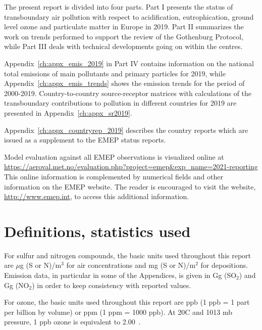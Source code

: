 The present report is divided into four parts. Part I presents the status
of transboundary air pollution with respect to acidification, eutrophication,
ground level ozone and particulate matter in Europe in 2019.
Part II summarizes the work on trends performed to support the review of the Gothenburg Protocol, while Part III deals with technical developments going on within the centres.

Appendix~\ref{ch:appx_emis_2019} in Part IV contains information on the national total emissions of main pollutants and  primary particles for 2019, while Appendix~\ref{ch:appx_emis_trends} shows the  emission trends for the period of 2000-2019. Country-to-country source-receptor matrices with calculations of
the transboundary contributions to pollution in different countries
for 2019 are presented in Appendix~\ref{ch:appx_sr2019}.

Appendix~\ref{ch:appx_countryrep_2019} describes the country
reports which are  issued as a supplement to the EMEP status reports.

Model evaluation against all EMEP observations is visualized online at \url{https://aeroval.met.no/evaluation.php?project=emep&exp_name=2021-reporting}
This online information is complemented by numerical fields and other
information on the EMEP website. The reader is encouraged to visit the
website, \url{http://www.emep.int}, to access this additional information.



\section{Definitions, statistics used}
\label{DEFS}

For sulfur and nitrogen compounds, the basic units used throughout
this report are $\mu$g (S or N)/m$^{3}$ for air concentrations and
mg (S or N)/m$^{2}$ for depositions. Emission data, in particular in
some of the Appendices, is given in Gg (SO$_2$)  and Gg (NO$_2$) in
order to keep consistency with reported values.

For ozone, the basic units used throughout this report are ppb (1 ppb
= 1 part per billion by volume) or ppm (1 ppm = 1000 ppb).  At
20\degrees C and 1013 mb pressure, 1 ppb ozone is equivalent to
2.00~\ug.  \vspace{0.5cm}

